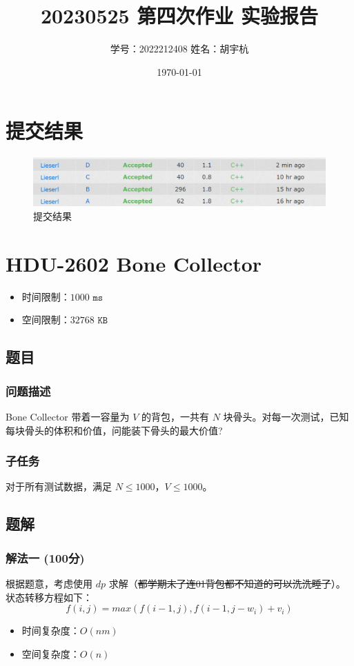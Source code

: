 \documentclass[UTF8, 12pt, a4paper, oneside]{ctexart}
\title{20230525 第四次作业 实验报告}
\author{学号：2022212408 姓名：胡宇杭}
\date{\today}
\begin{document}
\maketitle

\section*{提交结果}
\begin{figure}[htbp]
    \centering
    \includegraphics*[width = 6in]{submit result.png}
    \caption{提交结果}
\end{figure}

\section{HDU-2602 Bone Collector}
\begin{itemize}
    \item 时间限制：$1000\texttt{ ms}$
    \item 空间限制：$32768\texttt{ KB}$
\end{itemize}
\subsection{题目}
\subsubsection{问题描述}
\par Bone Collector 带着一容量为 $V$ 的背包，一共有 $N$ 块骨头。对每一次测试，已知每块骨头的体积和价值，问能装下骨头的最大价值?
\subsubsection{子任务}
\par 对于所有测试数据，满足 $N \leq 1000$，$V \leq 1000$。
\subsection{题解}
\subsubsection{解法一 (100分)}
\par 根据题意，考虑使用 $dp$ 求解（\sout{都学期末了连01背包都不知道的可以洗洗睡了}）。状态转移方程如下：$$f(i, j) = max(f(i-1, j), f(i-1, j-w_i) + v_i)$$
\begin{itemize}
    \item 时间复杂度：$O(nm)$
    \item 空间复杂度：$O(n)$
\end{itemize}
\end{document}
